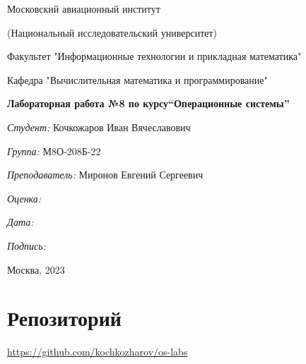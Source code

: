 \documentclass[a4paper, 12pt]{article}
\begin{document}
\thispagestyle{empty}	
\begin{center}
	Московский авиационный институт
	
	(Национальный исследовательский университет)
	
	Факультет "Информационные технологии и прикладная математика"
	
	Кафедра "Вычислительная математика и программирование"
	
\end{center}
\vspace{40ex}
\begin{center}
	\textbf{\large{Лабораторная работа №8 по курсу\linebreak \textquotedblleft Операционные системы\textquotedblright}}
\end{center}
\vspace{35ex}
\begin{flushright}
	\textit{Студент: } Кочкожаров Иван Вячеславович
	
	\vspace{2ex}
	\textit{Группа: } М8О-208Б-22
	
	\vspace{2ex}
	\textit{Преподаватель: } Миронов Евгений Сергеевич
	
	\vspace{2ex}
	\textit{Оценка: } \underline{\quad\quad\quad\quad\quad\quad}
	
	 \vspace{2ex}
	\textit{Дата: } \underline{\quad\quad\quad\quad\quad\quad}
	
	\vspace{2ex}
	\textit{Подпись: } \underline{\quad\quad\quad\quad\quad\quad}
	
\end{flushright}

\vspace{5ex}

\begin{vfill}
	\begin{center}
		Москва, 2023
	\end{center}	
\end{vfill}
\newpage


\begingroup
\color{black}
\tableofcontents\newpage
\endgroup

\section{Репозиторий}
\href{https://github.com/kochkozharov/os-labs}{https://github.com/kochkozharov/os-labs}
\end{document}
